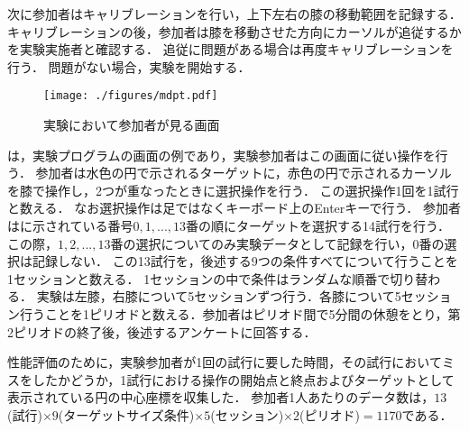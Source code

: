 \documentclass[submit, techrep]{ipsj}
\begin{document}
次に参加者はキャリブレーションを行い，上下左右の膝の移動範囲を記録する．
キャリブレーションの後，参加者は膝を移動させた方向にカーソルが追従するかを実験実施者と確認する．
追従に問題がある場合は再度キャリブレーションを行う．
問題がない場合，実験を開始する．\par
\begin{figure}[tb]
	\begin{center}
		\texttt{[image: ./figures/mdpt.pdf]}
	\end{center}
	\caption{実験において参加者が見る画面}
	\label{img:mdpt}
\end{figure}
は，実験プログラムの画面の例であり，実験参加者はこの画面に従い操作を行う．
参加者は水色の円で示されるターゲットに，赤色の円で示されるカーソルを膝で操作し，2つが重なったときに選択操作を行う．
この選択操作1回を1試行と数える．
なお選択操作は足ではなくキーボード上のEnterキーで行う．
参加者はに示されている番号$0,1,...,13$番の順にターゲットを選択する14試行を行う．この際，$1,2,...,13$番の選択についてのみ実験データとして記録を行い，$0$番の選択は記録しない．
この13試行を，後述する9つの条件すべてについて行うことを1セッションと数える．
1セッションの中で条件はランダムな順番で切り替わる．
実験は左膝，右膝について5セッションずつ行う．各膝について5セッション行うことを1ピリオドと数える．参加者はピリオド間で5分間の休憩をとり，第2ピリオドの終了後，後述するアンケートに回答する．\par
性能評価のために，実験参加者が1回の試行に要した時間，その試行においてミスをしたかどうか，1試行における操作の開始点と終点およびターゲットとして表示されている円の中心座標を収集した．
参加者1人あたりのデータ数は，$13$(試行)$\times 9$(ターゲットサイズ条件)$\times 5$(セッション)$\times 2$(ピリオド)$ = 1170$である．
\end{document}
